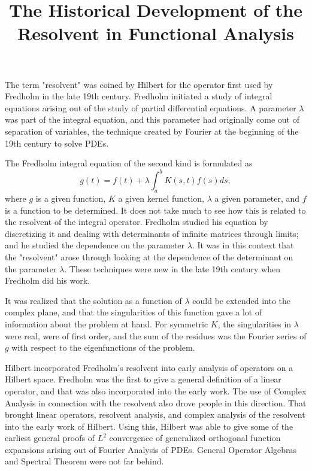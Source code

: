 \documentclass{article}
\title{The Historical Development of the Resolvent in Functional Analysis}
\author{}
\date{}
\begin{document}
\maketitle

The term "resolvent" was coined by Hilbert for the operator first used by Fredholm in the late 19th century. Fredholm initiated a study of integral equations arising out of the study of partial differential equations. A parameter $\lambda$ was part of the integral equation, and this parameter had originally come out of separation of variables, the technique created by Fourier at the beginning of the 19th century to solve PDEs.

The Fredholm integral equation of the second kind is formulated as
\begin{equation}
       g(t) = f(t) + \lambda\int_{a}^{b}K(s,t)f(s)ds,
\end{equation}
where $g$ is a given function, $K$ a given kernel function, $\lambda$ a given parameter, and $f$ is a function to be determined. It does not take much to see how this is related to the resolvent of the integral operator. Fredholm studied his equation by discretizing it and dealing with determinants of infinite matrices through limits; and he studied the dependence on the parameter $\lambda$. It was in this context that the "resolvent" arose through looking at the dependence of the determinant on the parameter $\lambda$. These techniques were new in the late 19th century when Fredholm did his work.

It was realized that the solution as a function of $\lambda$ could be extended into the complex plane, and that the singularities of this function gave a lot of information about the problem at hand. For symmetric $K$, the singularities in $\lambda$ were real, were of first order, and the sum of the residues was the Fourier series of $g$ with respect to the eigenfunctions of the problem.

Hilbert incorporated Fredholm's resolvent into early analysis of operators on a Hilbert space. Fredholm was the first to give a general definition of a linear operator, and that was also incorporated into the early work. The use of Complex Analysis in connection with the resolvent also drove people in this direction. That brought linear operators, resolvent analysis, and complex analysis of the resolvent into the early work of Hilbert. Using this, Hilbert was able to give some of the earliest general proofs of $L^2$ convergence of generalized orthogonal function expansions arising out of Fourier Analysis of PDEs. General Operator Algebras and Spectral Theorem were not far behind.
\end{document}
